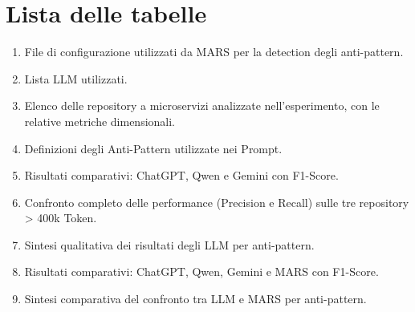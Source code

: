 \chapter*{Lista delle tabelle}
\begin{enumerate}
    \item File di configurazione utilizzati da MARS per la detection degli anti-pattern.
    \item Lista LLM utilizzati.
    \item Elenco delle repository a microservizi analizzate nell'esperimento, con le relative metriche dimensionali.
    \item Definizioni degli Anti-Pattern utilizzate nei Prompt.
    \item Risultati comparativi: ChatGPT, Qwen e Gemini con F1-Score.
    \item Confronto completo delle performance (Precision e Recall) sulle tre repository > 400k Token.
    \item Sintesi qualitativa dei risultati degli LLM per anti-pattern.
    \item Risultati comparativi: ChatGPT, Qwen, Gemini e MARS con F1-Score.
    \item Sintesi comparativa del confronto tra LLM e MARS per anti-pattern.
\end{enumerate}
